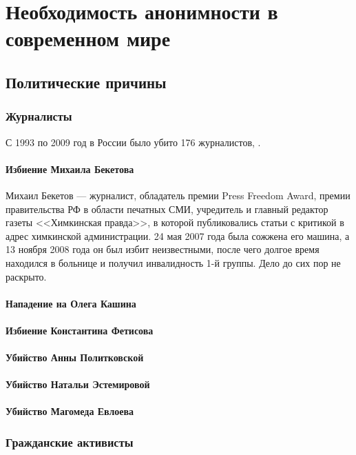 \part{Необходимость анонимности в современном мире}
\chapter{Политические причины}
\section{Журналисты}
С 1993 по 2009 год в России было убито 176 журналистов\cite{kill}, .
\subsection{Избиение Михаила Бекетова}
Михаил Бекетов --- журналист, обладатель премии Press Freedom Award\cite{beketov_award}, премии правительства РФ в области печатных СМИ\cite{beketov_gosaward}, учредитель и главный редактор газеты <<Химкинская правда>>, в которой публиковались статьи с критикой в адрес химкинской администрации. 24 мая 2007 года была сожжена его машина\cite{beketov_car}, а 13 ноября 2008 года он был избит неизвестными\cite{beketov_beat}, после чего долгое время находился в больнице и получил инвалидность 1-й группы\cite{beketov_invalid}. Дело до сих пор не раскрыто.
\subsection{Нападение на Олега Кашина}
\subsection{Избиение Константина Фетисова}
\subsection{Убийство Анны Политковской}
\subsection{Убийство Натальи Эстемировой}
\subsection{Убийство Магомеда Евлоева}
\section{Гражданские активисты}